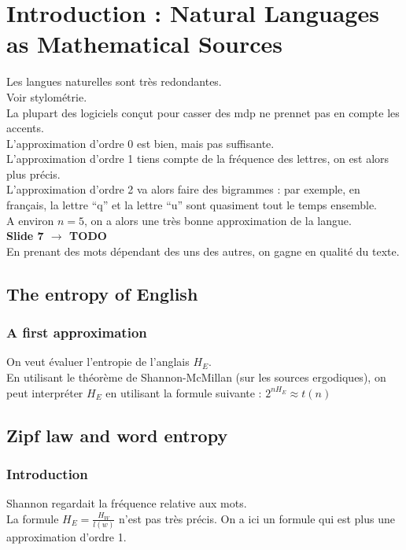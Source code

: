 \section{Introduction : Natural Languages as Mathematical Sources}
Les langues naturelles sont très redondantes.\\
Voir stylométrie.\\
La plupart des logiciels conçut pour casser des mdp ne prennet pas en compte les accents.\\
L'approximation d'ordre 0 est bien, mais pas suffisante.\\
L'approximation d'ordre 1 tiens compte de la fréquence des lettres, on est alors plus précis.\\
L'approximation d'ordre 2 va alors faire des bigrammes : par exemple, en français, la lettre \enquote{q} et la lettre \enquote{u} sont quasiment tout le temps ensemble.\\
A environ $n=5$, on a alors une très bonne approximation de la langue.\\
\textbf{Slide 7 $\rightarrow$ TODO}\\
En prenant des mots dépendant des uns des autres, on gagne en qualité du texte.\\
\subsection{The entropy of English}
\subsubsection{A first approximation}
On veut évaluer l'entropie de l'anglais $H_{E}$.\\
En utilisant le théorème de Shannon-McMillan (sur les sources ergodiques), on peut interpréter $H_E$ en utilisant la formule suivante : $2^{nH_{E}}\approx t(n)$\\
\subsection{Zipf law and word entropy}
\subsubsection{Introduction}
Shannon regardait la fréquence relative aux mots.\\
La formule $H_E=\frac{H_W}{l(w)}$ n'est pas très précis. On a ici un formule qui est plus une approximation d'ordre 1.\\

